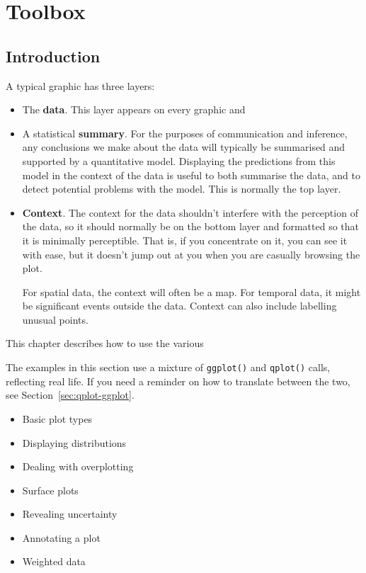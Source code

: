 

\chapter{Toolbox}
\label{cha:toolbox}

\section{Introduction}\label{sec:introduction}

A typical graphic has three layers:

\begin{itemize}
  \item The {\bf data}.  This layer appears on every graphic and 

  \item A statistical {\bf summary}.  For the purposes of communication and inference, any conclusions we make about the data will typically be summarised and supported by a quantitative model.  Displaying the predictions from this model in the context of the data is useful to both summarise the data, and to detect potential problems with the model.  This is normally the top layer.

  \item {\bf Context}.  The context for the data shouldn't interfere with the perception of the data, so it should normally be on the bottom layer and formatted so that it is minimally perceptible.  That is, if you concentrate on it, you can see it with ease, but it doesn't jump out at you when you are casually browsing the plot.
  
  For spatial data, the context will often be a map.  For temporal data, it might be significant events outside the data.  Context can also include labelling unusual points.
\end{itemize}


This chapter describes how to use the various 

The examples in this section use a mixture of {\tt ggplot()} and {\tt qplot()} calls, reflecting real life.  If you need a reminder on how to translate between the two, see Section~\ref{sec:qplot-ggplot}.

\begin{itemize}
  \item Basic plot types
  \item Displaying distributions
  \item Dealing with overplotting
  \item Surface plots
  \item Revealing uncertainty
  \item Annotating a plot
  \item Weighted data
\end{itemize}

